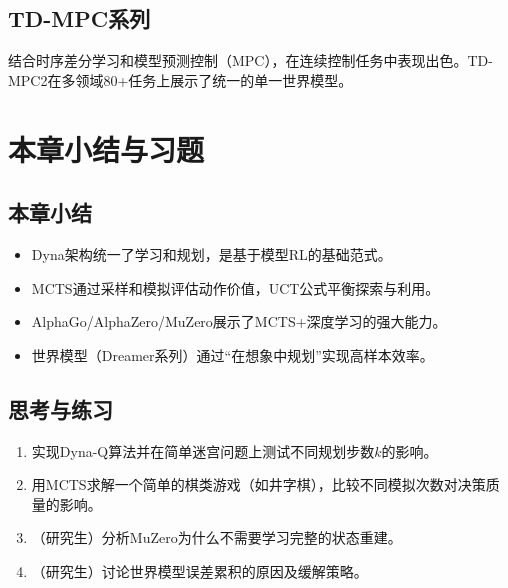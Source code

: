 \subsection{TD-MPC系列}

结合时序差分学习和模型预测控制（MPC），在连续控制任务中表现出色。TD-MPC2在多领域80+任务上展示了统一的单一世界模型。

\section{本章小结与习题}

\subsection*{本章小结}
\begin{itemize}
  \item Dyna架构统一了学习和规划，是基于模型RL的基础范式。
  \item MCTS通过采样和模拟评估动作价值，UCT公式平衡探索与利用。
  \item AlphaGo/AlphaZero/MuZero展示了MCTS+深度学习的强大能力。
  \item 世界模型（Dreamer系列）通过``在想象中规划''实现高样本效率。
\end{itemize}

\subsection*{思考与练习}
\begin{enumerate}
  \item 实现Dyna-Q算法并在简单迷宫问题上测试不同规划步数$k$的影响。
  \item 用MCTS求解一个简单的棋类游戏（如井字棋），比较不同模拟次数对决策质量的影响。
  \item （研究生）分析MuZero为什么不需要学习完整的状态重建。
  \item （研究生）讨论世界模型误差累积的原因及缓解策略。
\end{enumerate}
